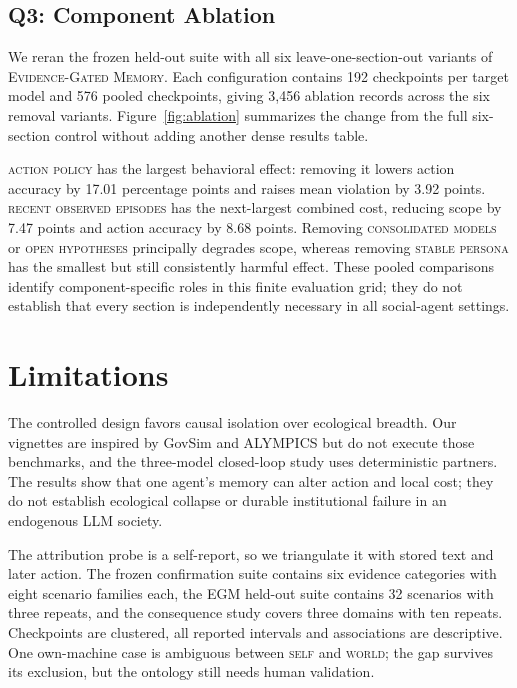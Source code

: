 \documentclass[sigconf,anonymous]{acmart}
\newcommand{\egm}{\textsc{Evidence-Gated Memory}}
\begin{document}
\subsection{Q3: Component Ablation}
\label{sec:ablation}

We reran the frozen held-out suite with all six leave-one-section-out variants
of \egm{}. Each configuration contains 192 checkpoints per target model and
576 pooled checkpoints, giving 3{,}456 ablation records across the six removal
variants. Figure~\ref{fig:ablation} summarizes the change from the full
six-section control without adding another dense results table.

\textsc{action policy} has the largest behavioral effect: removing it lowers
action accuracy by 17.01 percentage points and raises mean violation by 3.92
points. \textsc{recent observed episodes} has the next-largest combined cost,
reducing scope by 7.47 points and action accuracy by 8.68 points. Removing
\textsc{consolidated models} or \textsc{open hypotheses} principally degrades
scope, whereas removing \textsc{stable persona} has the smallest but still
consistently harmful effect. These pooled comparisons identify component-specific
roles in this finite evaluation grid; they do not establish that every section
is independently necessary in all social-agent settings.

\FloatBarrier

\section{Limitations}
\label{sec:limitations}

The controlled design favors causal isolation over ecological breadth. Our
vignettes are inspired by GovSim and ALYMPICS but do not execute those
benchmarks, and the three-model closed-loop study uses deterministic partners. The results
show that one agent's memory can alter action and local cost; they do not
establish ecological collapse or durable institutional failure in an endogenous
LLM society.

The attribution probe is a self-report, so we triangulate it with stored text
and later action. The frozen confirmation suite contains six evidence categories
with eight scenario families each, the EGM held-out suite contains 32 scenarios
with three repeats, and the consequence study covers three domains with ten
repeats. Checkpoints are clustered, all reported intervals and associations are
descriptive. One own-machine case is
ambiguous between \textsc{self} and \textsc{world}; the gap survives its
exclusion, but the ontology still needs human validation.
\end{document}
